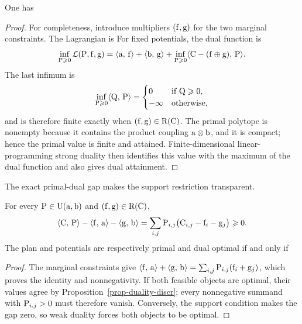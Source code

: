 \begin{prop}\label{prop-duality-discr}
One has
\end{prop}

\begin{proof}
For completeness, introduce multipliers $(\fD,\gD)$ for the two marginal constraints. The Lagrangian is
For fixed potentials, the dual function is
\[
	\inf_{\P\geq0}\mathcal L(\P,\fD,\gD)
	=\dotp{\a}{\fD}+\dotp{\b}{\gD}
	+\inf_{\P\geq0}\dotp{\C-(\fD\oplus\gD)}{\P}.
\]
The last infimum is
\[
	\inf_{\P\geq0}\dotp{\Q}{\P}
	=
	\begin{cases}
		0 & \text{if }\Q\geq0,\\
		-\infty & \text{otherwise},
	\end{cases}
\]
and is therefore finite exactly when $(\fD,\gD)\in\PotentialsD(\C)$. The primal polytope is nonempty because it contains the product coupling $\a\otimes\b$, and it is compact; hence the primal value is finite and attained. Finite-dimensional linear-programming strong duality then identifies this value with the maximum of the dual function and also gives dual attainment.
\end{proof}

The exact primal-dual gap makes the support restriction transparent.

\begin{prop}\label{prop-discrete-complementary-slackness}
	For every $\P\in\CouplingsD(\a,\b)$ and $(\fD,\gD)\in\PotentialsD(\C)$,
	\[
		\dotp{\C}{\P}-\dotp{\fD}{\a}-\dotp{\gD}{\b}
		=
		\sum_{i,j}\P_{i,j}\bigl(\C_{i,j}-\fD_i-\gD_j\bigr)
		\geq0.
	\]
	The plan and potentials are respectively primal and dual optimal if and only if
\end{prop}
\begin{proof}
	The marginal constraints give
	$\dotp{\fD}{\a}+\dotp{\gD}{\b}
	=\sum_{i,j}\P_{i,j}(\fD_i+\gD_j)$, which proves the identity and nonnegativity. If both feasible objects are optimal, their values agree by Proposition~\ref{prop-duality-discr}; every nonnegative summand with $\P_{i,j}>0$ must therefore vanish. Conversely, the support condition makes the gap zero, so weak duality forces both objects to be optimal.
\end{proof}

